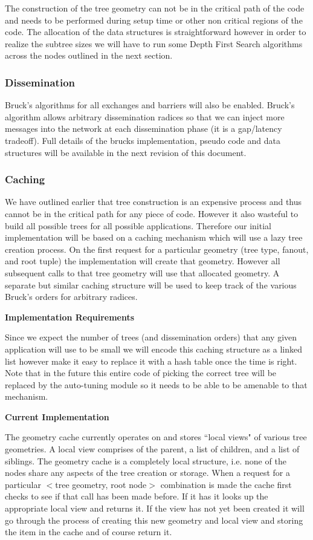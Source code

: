\documentclass[times,10pt]{article}
\begin{document}
The construction of the tree geometry can not be in the critical path of the code and needs to be performed during setup time or other non critical regions of the code. The allocation of the data structures is straightforward however in order to realize the subtree sizes we will have to run some Depth First Search algorithms across the nodes outlined in the next section.


\subsubsection{Dissemination}
Bruck's algorithms for all exchanges and barriers will also be enabled. Bruck's algorithm allows arbitrary dissemination radices so that we can inject more messages into the network at each dissemination phase (it is a gap/latency tradeoff). Full details of the brucks implementation, pseudo code and data structures will be available in the next revision of this document. 


\subsubsection{Caching}
We have outlined earlier that tree construction is an expensive process and thus cannot be in the critical path for any piece of code. However it also wasteful to build all possible trees for all possible applications. Therefore our initial implementation will be based on a caching mechanism which will use a lazy tree creation process. On the first request for a particular geometry (tree type, fanout, and root tuple) the implementation will create that geometry. However all subsequent calls to that tree geometry will use that allocated geometry.  A separate but similar caching structure will be used to keep track of the various Bruck's orders for arbitrary radices. 

\noindent \textbf{Implementation Requirements}

Since we expect the number of trees (and dissemination orders) that any given application will use to be small we will encode this caching structure as a linked list however make it easy to replace it with a hash table once the time is right. Note that in the future this entire code of picking the correct tree will be replaced by the auto-tuning module so it needs to be able to be amenable to that mechanism. 

\noindent \textbf{Current Implementation}

The geometry cache currently operates on and stores ``local views" of various tree geometries. A local view comprises of the parent, a list of children, and a list of siblings. The geometry cache is a completely local structure, i.e. none of the nodes share any aspects of the tree creation or storage. When a request for a particular $<$tree geometry, root node$>$ combination is made the cache first checks to see if that call has been made before. If it has it looks up the appropriate local view and returns it. If the view has not yet been created it will go through the process of creating this new geometry and local view and storing the item in the cache and of course return it. 
\end{document}

